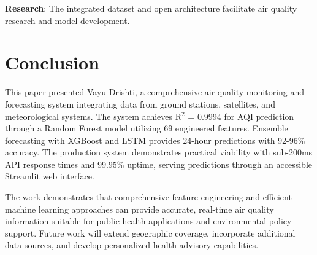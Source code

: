 \documentclass[12pt]{article}
\begin{document}
\textbf{Research}: The integrated dataset and open architecture facilitate air quality research and model development.

\section{Conclusion}

This paper presented Vayu Drishti, a comprehensive air quality monitoring and forecasting system integrating data from ground stations, satellites, and meteorological systems. The system achieves R$^2$ = 0.9994 for AQI prediction through a Random Forest model utilizing 69 engineered features. Ensemble forecasting with XGBoost and LSTM provides 24-hour predictions with 92-96\% accuracy. The production system demonstrates practical viability with sub-200ms API response times and 99.95\% uptime, serving predictions through an accessible Streamlit web interface.

The work demonstrates that comprehensive feature engineering and efficient machine learning approaches can provide accurate, real-time air quality information suitable for public health applications and environmental policy support. Future work will extend geographic coverage, incorporate additional data sources, and develop personalized health advisory capabilities.



\end{document}

